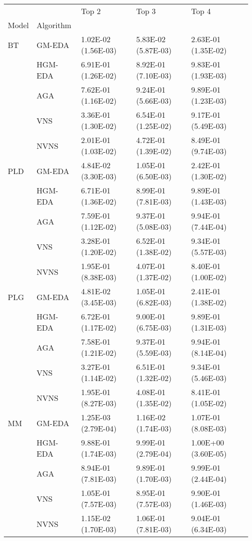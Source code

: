 \begin{tabular}{lllll}
\toprule
   &      &                Top 2 &                Top 3 &                Top 4 \\
Model & Algorithm &                      &                      &                      \\
\midrule
BT & GM-EDA &  1.02E-02 (1.56E-03) &  5.83E-02 (5.87E-03) &  2.63E-01 (1.35E-02) \\
   & HGM-EDA &  6.91E-01 (1.26E-02) &  8.92E-01 (7.10E-03) &  9.83E-01 (1.93E-03) \\
   & AGA &  7.62E-01 (1.16E-02) &  9.24E-01 (5.66E-03) &  9.89E-01 (1.23E-03) \\
   & VNS &  3.36E-01 (1.30E-02) &  6.54E-01 (1.25E-02) &  9.17E-01 (5.49E-03) \\
   & NVNS &  2.01E-01 (1.03E-02) &  4.72E-01 (1.39E-02) &  8.49E-01 (9.74E-03) \\
PLD & GM-EDA &  4.84E-02 (3.30E-03) &  1.05E-01 (6.50E-03) &  2.42E-01 (1.30E-02) \\
   & HGM-EDA &  6.71E-01 (1.36E-02) &  8.99E-01 (7.81E-03) &  9.89E-01 (1.43E-03) \\
   & AGA &  7.59E-01 (1.12E-02) &  9.37E-01 (5.08E-03) &  9.94E-01 (7.44E-04) \\
   & VNS &  3.28E-01 (1.20E-02) &  6.52E-01 (1.38E-02) &  9.34E-01 (5.57E-03) \\
   & NVNS &  1.95E-01 (8.38E-03) &  4.07E-01 (1.37E-02) &  8.40E-01 (1.00E-02) \\
PLG & GM-EDA &  4.81E-02 (3.45E-03) &  1.05E-01 (6.82E-03) &  2.41E-01 (1.38E-02) \\
   & HGM-EDA &  6.72E-01 (1.17E-02) &  9.00E-01 (6.75E-03) &  9.89E-01 (1.31E-03) \\
   & AGA &  7.58E-01 (1.21E-02) &  9.37E-01 (5.59E-03) &  9.94E-01 (8.14E-04) \\
   & VNS &  3.27E-01 (1.14E-02) &  6.51E-01 (1.32E-02) &  9.34E-01 (5.46E-03) \\
   & NVNS &  1.95E-01 (8.27E-03) &  4.08E-01 (1.35E-02) &  8.41E-01 (1.05E-02) \\
MM & GM-EDA &  1.25E-03 (2.79E-04) &  1.16E-02 (1.74E-03) &  1.07E-01 (8.08E-03) \\
   & HGM-EDA &  9.88E-01 (1.74E-03) &  9.99E-01 (2.79E-04) &  1.00E+00 (3.60E-05) \\
   & AGA &  8.94E-01 (7.81E-03) &  9.89E-01 (1.70E-03) &  9.99E-01 (2.44E-04) \\
   & VNS &  1.05E-01 (7.57E-03) &  8.95E-01 (7.57E-03) &  9.90E-01 (1.46E-03) \\
   & NVNS &  1.15E-02 (1.70E-03) &  1.06E-01 (7.81E-03) &  9.04E-01 (6.34E-03) \\
\bottomrule
\end{tabular}
